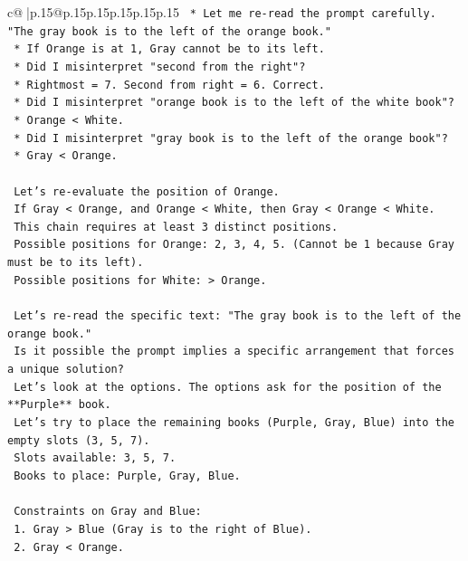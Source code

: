 \documentclass{article}
\begin{document}
{\begin{supertabular}{c@{$\;$}|p{.15\linewidth}@{}p{.15\linewidth}p{.15\linewidth}p{.15\linewidth}p{.15\linewidth}p{.15\linewidth}}
{{{\texttt{    *   Let me re{-}read the prompt carefully. "The gray book is to the left of the orange book."} \\
\texttt{    *   If Orange is at 1, Gray cannot be to its left.} \\
\texttt{    *   Did I misinterpret "second from the right"?} \\
\texttt{        *   Rightmost = 7. Second from right = 6. Correct.} \\
\texttt{    *   Did I misinterpret "orange book is to the left of the white book"?} \\
\texttt{        *   Orange < White.} \\
\texttt{    *   Did I misinterpret "gray book is to the left of the orange book"?} \\
\texttt{        *   Gray < Orange.} \\
\\ 
\texttt{    Let's re{-}evaluate the position of Orange.} \\
\texttt{    If Gray < Orange, and Orange < White, then Gray < Orange < White.} \\
\texttt{    This chain requires at least 3 distinct positions.} \\
\texttt{    Possible positions for Orange: 2, 3, 4, 5. (Cannot be 1 because Gray must be to its left).} \\
\texttt{    Possible positions for White: > Orange.} \\
\\ 
\texttt{    Let's re{-}read the specific text: "The gray book is to the left of the orange book."} \\
\texttt{    Is it possible the prompt implies a specific arrangement that forces a unique solution?} \\
\texttt{    Let's look at the options. The options ask for the position of the **Purple** book.} \\
\texttt{    Let's try to place the remaining books (Purple, Gray, Blue) into the empty slots (3, 5, 7).} \\
\texttt{    Slots available: 3, 5, 7.} \\
\texttt{    Books to place: Purple, Gray, Blue.} \\
\\ 
\texttt{    Constraints on Gray and Blue:} \\
\texttt{    1. Gray > Blue (Gray is to the right of Blue).} \\
\texttt{    2. Gray < Orange.} \\
\\ 
}}}
\end{supertabular}}
\end{document}
